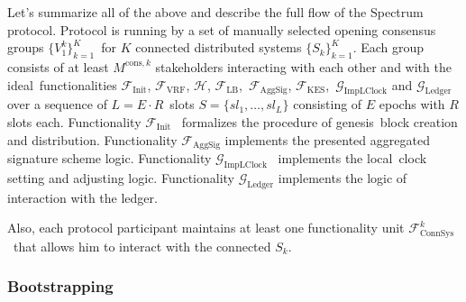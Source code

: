 Let's summarize all of the above and describe the full flow of the Spectrum protocol.
Protocol is running by a set of manually selected opening consensus groups $\{V^k_1\}_{k=1}^K$\
for $K$ connected distributed systems $\{S_k\}_{k=1}^K$.
Each group consists of at least $M^{\text{cons}, k}$ stakeholders interacting with each other and with the ideal\
functionalities $\mathcal{F}_{\text{Init}}$, ${\mathcal{F}}_{\text{VRF}}$, $\mathcal{H}$, ${\mathcal{F}}_{\text{LB}}$,\
$\mathcal{F}_{\text{AggSig}}$, ${\mathcal{F}}_{\text{KES}}$,\
$\mathcal{G}_{\text{ImpLClock}}$ and $\mathcal{G}_{\text{Ledger}}$ over a sequence of $L = E \cdot R$\
slots ${S=\{sl_1,\dots,sl_L\}}$ consisting of $E$ epochs with $R$ slots each.
Functionality ${\mathcal{F}}_{\text{Init}}$~\cite{Badertscher2018} formalizes the procedure of genesis\
block creation and distribution.
Functionality ${\mathcal{F}}_{\text{AggSig}}$ implements the presented aggregated signature scheme logic.
Functionality $\mathcal{G}_{\text{ImpLClock}}$~\cite{cryptoeprint:2019/838} implements the local\
clock setting and adjusting logic.
Functionality $\mathcal{G}_{\text{Ledger}}$ implements the logic of interaction with the ledger.

Also, each protocol participant maintains at least one functionality unit $\mathcal{F}^k_{\text{ConnSys}}$\
that allows him to interact with the connected $S_k$.

\subsubsection{Bootstrapping}\label{subsubsec:bootstrapping}

